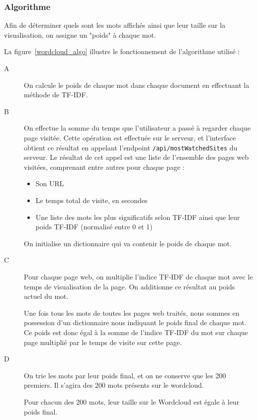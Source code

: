 		\subsubsection{Algorithme}

			Afin de déterminer quels sont les mots affichés ainsi que leur taille sur la visualisation, on assigne un "poids" à chaque mot.

			La figure~\ref{wordcloud_algo} illustre le fonctionnement de l'algorithme utilisé :
			\begin{description}
				\item[A] On calcule le poids de chaque mot dans chaque document en effectuant la méthode de TF-IDF.

				\item[B] On effectue la somme du temps que l'utilisateur a passé à regarder chaque page visitée. Cette opération est effectuée sur le serveur, et l'interface obtient ce résultat en appelant l'endpoint \texttt{/api/mostWatchedSites} du serveur. Le résultat de cet appel est une liste de l'ensemble des pages web visitées, comprenant entre autres pour chaque page : 
				\begin{itemize}
					\item Son URL
					\item Le temps total de visite, en secondes
					\item Une liste des mots les plus significatifs selon TF-IDF ainsi que leur poids TF-IDF (normalisé entre 0 et 1)
				\end{itemize}
				
				On initialise un dictionnaire qui va contenir le poids de chaque mot.

				\item[C] Pour chaque page web, on multiplie l'indice TF-IDF de chaque mot avec le temps de visualisation de la page. On additionne ce résultat au poids actuel du mot.
				
				Une fois tous les mots de toutes les pages web traités, nous sommes en possession d'un dictionnaire nous indiquant le poids final de chaque mot. Ce poids est donc égal à la somme de l'indice TF-IDF du mot sur chaque page multiplié par le temps de visite sur cette page.
				
				\item[D] On trie les mots par leur poids final, et on ne conserve que les 200 premiers. Il s'agira des 200 mots présents sur le wordcloud.
				
				Pour chacun des 200 mots, leur taille sur le Wordcloud est égale à leur poids final.
			\end{description}

